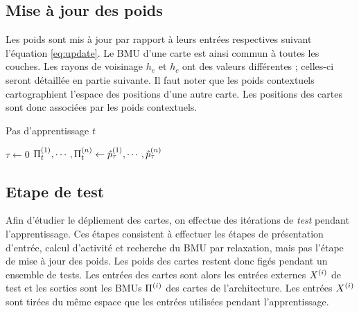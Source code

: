 \subsection{Mise à jour des poids}
Les poids sont mis à jour par rapport à leurs entrées respectives suivant l'équation \ref{eq:update}. Le BMU d'une carte est ainsi commun à toutes les couches. Les rayons de voisinage $h_e$ et $h_c$ ont des valeurs différentes ; celles-ci seront détaillée en partie suivante. 
Il faut noter que les poids contextuels cartographient l'espace des positions d'une autre carte. Les positions des cartes sont donc associées par les poids contextuels.
\begin{algorithm}\label{algo:cxsom}
\caption{Pas d'apprentissage $t$}
\SetAlgoLined
  $\tau \leftarrow 0$ \;
  $\Pi^{({1})}_t, \cdots, \Pi^{({n})}_t \leftarrow \hat{p}^{({1})}_\tau, \cdots , \hat{p}^{({n})}_\tau$ \;
 \end{algorithm}
 
\subsection{Etape de test}

Afin d'étudier le dépliement des cartes, on effectue des itérations de \emph{test} pendant l'apprentissage. Ces étapes consistent à effectuer les étapes de présentation d'entrée, calcul d'activité et recherche du BMU par relaxation, mais pas l'étape de mise à jour des poids. Les poids des cartes restent donc figés pendant un ensemble de tests. Les entrées des cartes sont alors les entrées externes $X^{({i})}$ de test et les sorties sont les BMUs $\Pi^{({i})}$ des cartes de l'architecture. 
Les entrées $X^{({i})}$ sont tirées du même espace que les entrées utilisées pendant l'apprentissage.

